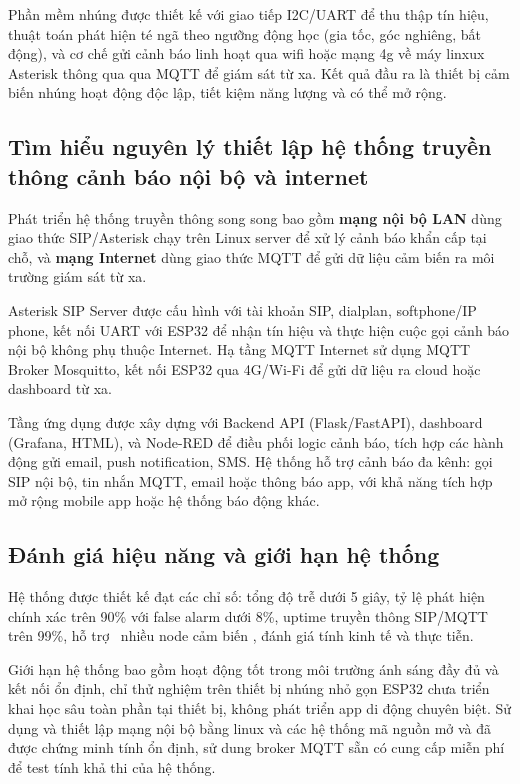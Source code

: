 Phần mềm nhúng được thiết kế với giao tiếp I2C/UART để thu thập tín hiệu, thuật toán phát hiện té ngã theo ngưỡng động học (gia tốc, góc nghiêng, bất động), và cơ chế gửi cảnh báo linh hoạt qua wifi hoặc mạng 4g về máy linxux Asterisk thông qua qua MQTT để giám sát từ xa. Kết quả đầu ra là thiết bị cảm biến nhúng hoạt động độc lập, tiết kiệm năng lượng và có thể mở rộng.

\subsection{Tìm hiểu nguyên lý thiết lập hệ thống truyền thông cảnh báo nội bộ và internet}

Phát triển hệ thống truyền thông song song bao gồm \textbf{mạng nội bộ LAN} dùng giao thức SIP/Asterisk chạy trên Linux server để xử lý cảnh báo khẩn cấp tại chỗ, và \textbf{mạng Internet} dùng giao thức MQTT để gửi dữ liệu cảm biến ra môi trường giám sát từ xa.

Asterisk SIP Server được cấu hình với tài khoản SIP, dialplan, softphone/IP phone, kết nối UART với ESP32 để nhận tín hiệu và thực hiện cuộc gọi cảnh báo nội bộ không phụ thuộc Internet. Hạ tầng MQTT Internet sử dụng MQTT Broker Mosquitto, kết nối ESP32 qua 4G/Wi-Fi để gửi dữ liệu ra cloud hoặc dashboard từ xa.

Tầng ứng dụng được xây dựng với Backend API (Flask/FastAPI), dashboard (Grafana, HTML), và Node-RED để điều phối logic cảnh báo, tích hợp các hành động gửi email, push notification, SMS. Hệ thống hỗ trợ cảnh báo đa kênh: gọi SIP nội bộ, tin nhắn MQTT, email hoặc thông báo app, với khả năng tích hợp mở rộng mobile app hoặc hệ thống báo động khác.

\subsection{Đánh giá hiệu năng và giới hạn hệ thống}

Hệ thống được thiết kế đạt các chỉ số: tổng độ trễ dưới 5 giây, tỷ lệ phát hiện chính xác trên 90\% với false alarm dưới 8\%, uptime truyền thông SIP/MQTT trên 99\%, hỗ trợ  nhiều node cảm biến , đánh giá tính kinh tế và thực tiễn.

Giới hạn hệ thống bao gồm hoạt động tốt trong môi trường ánh sáng đầy đủ và kết nối ổn định, chỉ thử nghiệm trên thiết bị nhúng nhỏ gọn ESP32 chưa triển khai học sâu toàn phần tại thiết bị, không phát triển app di động chuyên biệt. Sử dụng và thiết lập mạng nội bộ bằng linux và các hệ thống mã nguồn mở và đã được chứng minh tính ổn định, sử dung broker MQTT sẵn có cung cấp miễn phí để test tính khả thi của hệ thống.
